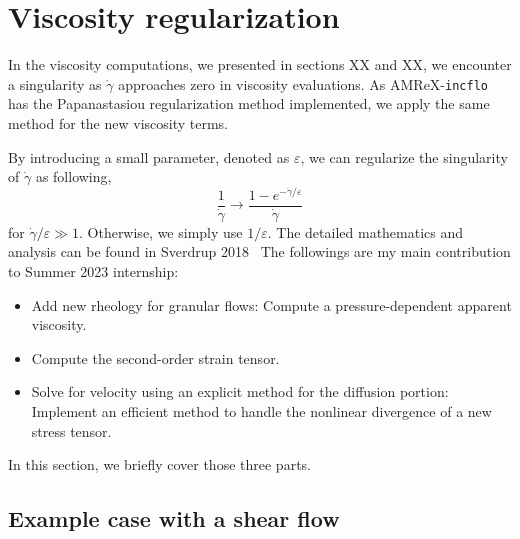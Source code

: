\section{Viscosity regularization}
In the viscosity computations, we presented in sections XX and XX, we encounter a singularity as $\dot{\gamma}$ approaches zero in viscosity evaluations. 
As AMReX-\verb+incflo+ has the Papanastasiou regularization method implemented, we apply the same method for the new viscosity terms.
\par
By introducing a small parameter, denoted as $\varepsilon$, we can regularize the singularity of $\dot{\gamma}$ as following,
\[
  \frac{1}{\dot{\gamma}} \rightarrow \frac{1-e^{-\dot{\gamma} / \varepsilon}}{\dot{\gamma}}  
\]
for $\dot{\gamma}/\varepsilon \gg 1$. Otherwise, we simply use $1/\varepsilon$. 
The detailed mathematics and analysis can be found in Sverdrup 2018~\cite{sverdrup_highly_2018}
 The followings are my main contribution to  Summer 2023 internship:
\begin{itemize}
	\item Add new rheology for granular flows: Compute a pressure-dependent apparent viscosity.
	\item Compute the second-order strain tensor.
	\item Solve for velocity using an explicit method for the diffusion portion: Implement an efficient method to handle the nonlinear divergence of a new stress tensor.
\end{itemize}
In this section, we briefly cover those three parts.
\subsection{Example case with a shear flow}

